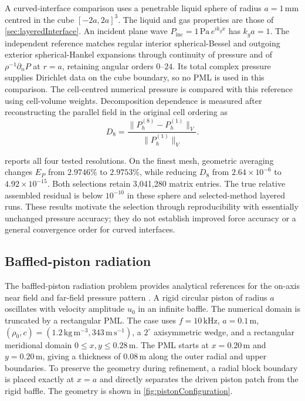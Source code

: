 \documentclass[final,12pt,nopreprintline,longtitle]{elsarticle}
\newcommand{\paperroot}{}
\newcommand{\paperroot}{paper_aHF/}
\newcommand{\paperinput}[1]{}
\begin{document}
A curved-interface comparison uses a penetrable liquid sphere of radius
$a=1\,\mathrm{mm}$ centred in the cube $[-2a,2a]^3$.  The liquid and gas
properties are those of \cref{sec:layeredInterface}.  An incident plane wave
$P_{\mathrm{inc}}=1\,\mathrm{Pa}\,e^{ik_gx}$ has $k_ga=1$.
The independent reference matches regular interior spherical-Bessel and
outgoing exterior spherical-Hankel expansions through continuity of
pressure and of $\rho^{-1}\partial_nP$ at $r=a$, retaining angular orders
$0$--$24$.  Its total complex pressure supplies Dirichlet data on the
cube boundary, so no PML is used in this comparison.  The cell-centred
numerical pressure is compared with this reference using cell-volume
weights.  Decomposition dependence is measured after reconstructing the
parallel field in the original cell ordering as
\begin{equation}
 D_8=\frac{\lVert P_h^{(8)}-P_h^{(1)}\rVert_V}
                {\lVert P_h^{(1)}\rVert_V}.
 \label{eq:parallelPressureDifference}
\end{equation}

\paperinput{revised-assets/tables/geometric_comparison_table.tex}

 reports all four tested resolutions.
On the finest mesh, geometric averaging changes $E_P$ from $2.9746\%$
to $2.9753\%$, while reducing $D_8$ from $2.64\times10^{-6}$ to
$4.92\times10^{-15}$.  Both selections retain 3,041,280 matrix entries.
The true relative assembled residual is below $10^{-10}$ in these
sphere and selected-method layered runs.  These results motivate the
selection through reproducibility with essentially unchanged pressure
accuracy; they do not establish improved force accuracy or a general
convergence order for curved interfaces.

\FloatBarrier
\subsection{Baffled-piston radiation}
\label{sec:piston}

The baffled-piston radiation problem provides analytical references for the
on-axis near field and far-field pressure pattern \cite{oelze2003piston}.  A rigid
circular piston of radius $a$ oscillates with velocity amplitude $u_0$ in an
infinite baffle.  The numerical domain is truncated by a rectangular PML.
The case uses $f=10\,\mathrm{kHz}$, $a=0.1\,\mathrm{m}$,
$(\rho_0,c)=(1.2\,\mathrm{kg\,m^{-3}},343\,\mathrm{m\,s^{-1}})$, a
$2^\circ$ axisymmetric wedge, and a rectangular meridional domain
$0\leq x,y\leq0.28\,\mathrm{m}$.  The PML starts at $x=0.20\,\mathrm{m}$ and
$y=0.20\,\mathrm{m}$, giving a thickness of $0.08\,\mathrm{m}$ along the outer
radial and upper boundaries.  To preserve the geometry during refinement, a
radial block boundary is placed exactly at $x=a$ and directly separates the
driven piston patch from the rigid baffle.  The geometry is shown in
\cref{fig:pistonConfiguration}.
\end{document}
